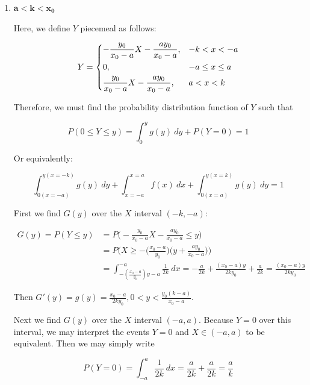 \documentclass[10pt, oneside]{article}
\begin{document}
\begin{enumerate}[label=5.\arabic*]
\begin{enumerate}
	Since the event that $Y = 0$ is equivalent to the event that $X \in (-k, k)$, we may simply calculate $P(Y = 0) = \int^k_{-k} \frac{1}{2k} \ dx = \boxed{g(0) = 1}$. Therefore, $\boxed{g(y) = 0}, y \neq 0$.
	
	\item  \begin{tcolorbox}[
	  colback=Cerulean!5!white,
	  colframe=Cerulean!75!black]
	\textbf{$\bm{a < k < x_0}$}
	\end{tcolorbox}
	
	Here, we define $Y$ piecemeal as follows:
	
	\[ Y = \begin{dcases}
	-\frac{y_0}{x_0 - a} X - \frac{ay_0}{x_0 - a}, & -k < x < -a \\
	0, &-a \leq x \leq a \\
	\frac{y_0}{x_0 - a} X - \frac{ay_0}{x_0 - a}, &a < x < k
	\end{dcases} \]
	
	Therefore, we must find the probability distribution function of $Y$ such that
	
	\[ P(0 \leq Y \leq y) =  \int^y_0 g(y) \ dy + P(Y = 0) = 1 \]
	
	Or equivalently:
	
	\[ \int^{y (x = -k)}_{0 (x = -a)} g(y) \ dy + \int^{x = a}_{x = -a} f(x) \ dx + \int^{y (x = k)}_{0 (x = a)} g(y) \ dy = 1 \]
	
	First we find $G(y)$ over the $X$ interval $(-k, -a)$:
	
	\begin{align*}
	G(y) = P(Y \leq y) &= P\Big( -\frac{y_0}{x_0 - a} X - \frac{ay_0}{x_0 - a} \leq y \Big) \\
	&= P \Big( X \geq - \Big( \frac{x_0 - a}{y_0} \Big) \Big( y + \frac{ay_0}{x_0 - a} \Big) \Big) \\
	&= \int^{-a}_{-(\frac{x_0 - a}{y_0}) y - a} \frac{1}{2k} \ dx = -\frac{a}{2k} + \frac{(x_0 - a)y}{2ky_0} + \frac{a}{2k} = \frac{(x_0 - a)y}{2ky_0}
	\end{align*}
	
	Then $G'(y) = g(y) = \boxed{\frac{x_0 - a}{2ky_0}, 0 < y < \frac{y_0 (k - a)}{x_0 - a}}$.
	
	Next we find $G(y)$ over the $X$ interval $(-a, a)$. Because $Y = 0$ over this interval, we may interpret the events $Y = 0$ and $X \in (-a,a)$ to be equivalent. Then we may simply write
	
	\[ P(Y = 0) = \int^a_{-a} \frac{1}{2k} \ dx = \frac{a}{2k} + \frac{a}{2k} = \boxed{\frac{a}{k}} \]
	

\end{enumerate}
\end{enumerate}
\end{document}
